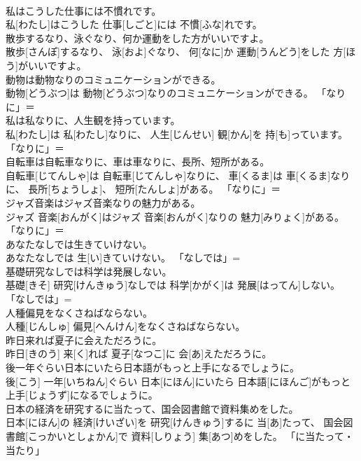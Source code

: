 \documentclass[8pt]{extreport}
\begin{document}
\begin{CJK}{UTF8}{min}
\\	私はこうした仕事には不慣れです。	
\\	私[わたし]はこうした 仕事[しごと]には 不慣[ふな]れです。	
\\	散歩するなり、泳ぐなり、何か運動をした方がいいですよ。	
\\	散歩[さんぽ]するなり、 泳[およ]ぐなり、 何[なに]か 運動[うんどう]をした 方[ほう]がいいですよ。	
\\	動物は動物なりのコミュニケーションができる。	
\\	動物[どうぶつ]は 動物[どうぶつ]なりのコミュニケーションができる。	「なりに」＝ 
\\	私は私なりに、人生観を持っています。	
\\	私[わたし]は 私[わたし]なりに、 人生[じんせい] 観[かん]を 持[も]っています。	「なりに」＝ 
\\	自転車は自転車なりに、車は車なりに、長所、短所がある。	
\\	自転車[じてんしゃ]は 自転車[じてんしゃ]なりに、 車[くるま]は 車[くるま]なりに、 長所[ちょうしょ]、 短所[たんしょ]がある。	「なりに」＝ 
\\	ジャズ音楽はジャズ音楽なりの魅力がある。	
\\	ジャズ 音楽[おんがく]はジャズ 音楽[おんがく]なりの 魅力[みりょく]がある。	「なりに」＝ 
\\	あなたなしでは生きていけない。	
\\	あなたなしでは 生[い]きていけない。	「なしでは」= 
\\	基礎研究なしでは科学は発展しない。	
\\	基礎[きそ] 研究[けんきゅう]なしでは 科学[かがく]は 発展[はってん]しない。	「なしでは」= 
\\	人種偏見をなくさねばならない。	
\\	人種[じんしゅ] 偏見[へんけん]をなくさねばならない。	
\\	昨日来れば夏子に会えただろうに。	
\\	昨日[きのう] 来[く]れば 夏子[なつこ]に 会[あ]えただろうに。	
\\	後一年ぐらい日本にいたら日本語がもっと上手になるでしょうに。	
\\	後[こう] 一年[いちねん]ぐらい 日本[にほん]にいたら 日本語[にほんご]がもっと 上手[じょうず]になるでしょうに。	
\\	日本の経済を研究するに当たって、国会図書館で資料集めをした。	
\\	日本[にほん]の 経済[けいざい]を 研究[けんきゅう]するに 当[あ]たって、 国会図書館[こっかいとしょかん]で 資料[しりょう] 集[あつ]めをした。	「に当たって・当たり」

\end{CJK}
\end{document}
